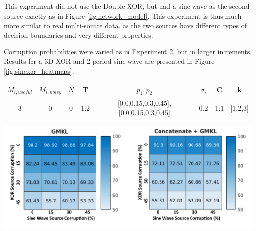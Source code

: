 \documentclass{article}
\begin{document}
This experiment did not use the Double XOR, but had a sine wave as the second
source exactly as in Figure \ref{fig:network_model}. This experiment is thus
much more similar to real multi-source data, as the two sources have different
types of decision boundaries and very different properties.

Corruption probabilities were varied as in Experiment 2, but in larger
increments. Results for a 3D XOR and 2-period sine wave are presented in Figure
\ref{fig:sinexor_heatmaps}.


\begin{minipage}{\textwidth}
\centering
\begin{tabular}{|c|c|c|c|c|c|c|c|}
\hline
$M_{i,useful}$ & $M_{i, noisy}$ & $N$ & T &  $p_1, p_2$ & $\sigma_i$ & C &  k  \\
\hline
3 & 0 & 0 & 1:2 & [0.0,0.15,0.3,0.45],[0.0,0.15,0.3,0.45] & 0.2 & 1:1 & [1,2,3]  \\
\hline
\end{tabular}
\label{tab:exp_4_params}
\end{minipage}


\begin{minipage}{\textwidth}
    \centering
    \includegraphics[width=\textwidth]{SineXORCorrupt.png}
    \label{fig:sinexor_heatmaps}
\end{minipage}
\end{document}
